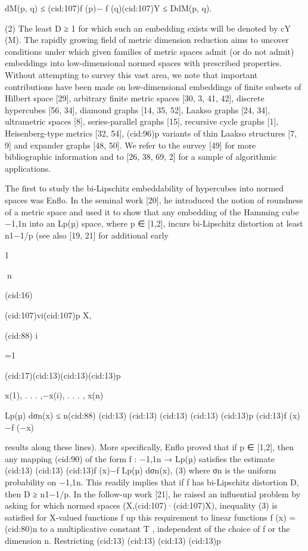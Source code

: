 dM(p, q) ≤ (cid:107)f (p)− f (q)(cid:107)Y ≤ DdM(p, q).

(2)
The least D ≥ 1 for which such an embedding exists will be denoted by cY (M). The rapidly
growing ﬁeld of metric dimension reduction aims to uncover conditions under which given
families of metric spaces admit (or do not admit) embeddings into low-dimensional normed
spaces with prescribed properties. Without attempting to survey this vast area, we note that
important contributions have been made on low-dimensional embeddings of ﬁnite subsets of
Hilbert space [29], arbitrary ﬁnite metric spaces [30, 3, 41, 42], discrete hypercubes [56, 34],
diamond graphs [14, 35, 52], Laakso graphs [24, 34], ultrametric spaces [8], series-parallel
graphs [15], recursive cycle graphs [1], Heisenberg-type metrics [32, 54], (cid:96)p variants of thin
Laakso structures [7, 9] and expander graphs [48, 50]. We refer to the survey [49] for more
bibliographic information and to [26, 38, 69, 2] for a sample of algorithmic applications.

The ﬁrst to study the bi-Lipschitz embeddability of hypercubes into normed spaces was
Enﬂo. In the seminal work [20], he introduced the notion of roundness of a metric space and
used it to show that any embedding of the Hamming cube {−1,1}n into an Lp(µ) space, where
p ∈ [1,2], incurs bi-Lipschitz distortion at least n1−1/p (see also [19, 21] for additional early

1

n

(cid:16)

(cid:107)vi(cid:107)p
X,

(cid:88) i

=1

(cid:17)(cid:13)(cid:13)(cid:13)p

x(1), . . . ,−x(i), . . . , x(n)

Lp(µ) dσn(x) ≤ n(cid:88)
(cid:13)
(cid:13)
(cid:13)
(cid:13)
(cid:13)p
(cid:13)f (x)−f (−x)

results along these lines). More speciﬁcally, Enﬂo proved that if p ∈ [1,2], then any mapping
(cid:90)
of the form f : {−1,1}n → Lp(µ) satisﬁes the estimate
(cid:13)
(cid:13)
(cid:13)f (x)−f
Lp(µ) dσn(x), (3)
where σn is the uniform probability on {−1,1}n. This readily implies that if f has bi-Lipschitz
distortion D, then D ≥ n1−1/p. In the follow-up work [21], he raised an inﬂuential problem by
asking for which normed spaces (X,(cid:107)·(cid:107)X), inequality (3) is satisﬁed for X-valued functions f up
this requirement to linear functions f (x) =(cid:80)n
to a multiplicative constant T , independent of the choice of f or the dimension n. Restricting
(cid:13)
(cid:13)
(cid:13)
(cid:13)p

